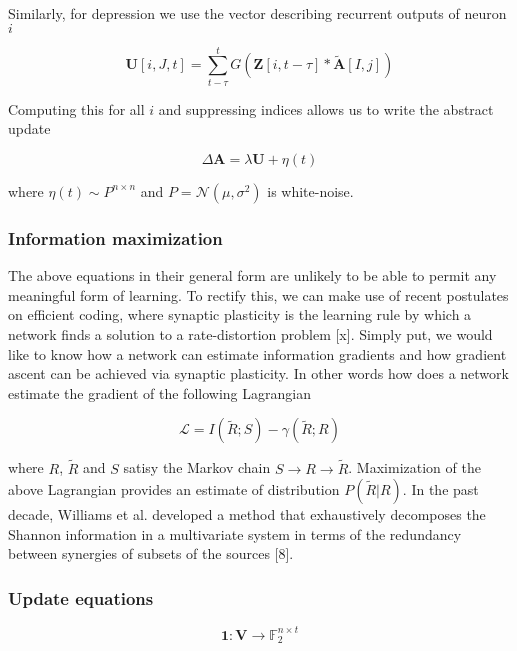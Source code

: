 \documentclass{article} %
\begin{document}
Similarly, for depression we use the vector describing recurrent outputs of neuron $i$

\begin{equation*}
\mathbf{U}[i,J,t] = \sum_{t-\tau}^{t} G\left( \mathbf{Z}[i,t-\tau]*\tilde{\mathbf{A}}[I,j]\right)
\end{equation*}

Computing this for all $i$ and suppressing indices allows us to write the abstract update

\begin{equation*}
\Delta \mathbf{A} = \lambda\mathbf{U} + \eta(t)
\end{equation*}

where $\eta(t) \sim P^{n\times n}$ and $P = \mathcal{N}(\mu, \sigma^{2})$ is white-noise.

\subsubsection{Information maximization}

The above equations in their general form are unlikely to be able to permit any meaningful form of learning. To rectify this, we can make use of recent postulates on efficient coding, where synaptic plasticity is the learning rule by which a network finds a solution to a rate-distortion problem [x]. Simply put, we would like to know how a network can estimate information gradients and how gradient ascent can be achieved via synaptic plasticity. In other words how does a network estimate the gradient of the following Lagrangian

\begin{equation*}
\mathbf{\mathcal{L}} = I(\tilde{R}; S) - \gamma(\tilde{R}; R)
\end{equation*}

where $R$, $\tilde{R}$ and $S$ satisy the Markov chain $S \rightarrow R \rightarrow \tilde{R}$. Maximization of the above Lagrangian provides an estimate of distribution $P(\tilde{R}|R)$. In the past decade, Williams et al. developed a method that exhaustively decomposes the Shannon information in a multivariate system in terms of the redundancy between synergies of subsets of the sources [8].
 

\subsubsection{Update equations}

\begin{equation*}
\mathbf{1}: \mathbf{V} \rightarrow \mathbb{F}_{2}^{n\times t}
\end{equation*}
\end{document}
